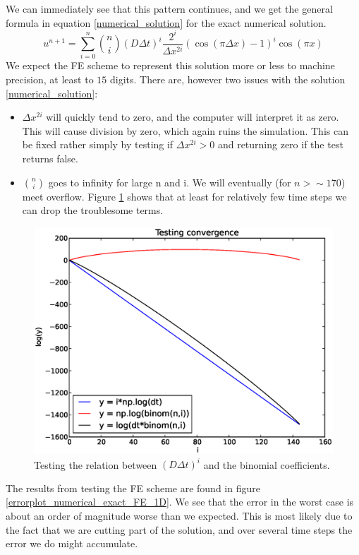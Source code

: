 We can immediately see that this pattern continues, and we get the general formula in equation \ref{numerical_solution} for the exact numerical solution.
\begin{equation}\label{numerical_solution}
  u^{n+1} = \sum\limits_{i=0}^n {n\choose i}\left(D\Delta t\right)^i\frac{2^i}{\Delta x^{2i}}\left(\cos(\pi\Delta x)-1\right)^i\cos(\pi x)
\end{equation}
We expect the FE scheme to represent this solution more or less to machine precision, at least to $15$ digits. 
There are, however two issues with the solution \ref{numerical_solution}:
\begin{itemize}
 \item $\Delta x^{2i}$ will quickly tend to zero, and the computer will interpret it as zero. This will cause division by zero, which again ruins the simulation. This can be fixed rather simply by testing if $\Delta x^{2i}>0$ and returning zero if the test returns false.
 \item ${n\choose i}$ goes to infinity for large n and i. We will eventually (for $n>\sim170$) meet overflow. Figure \ref{convergence_exact_numerical_1d_n145} shows that at least for relatively few time steps  we can drop the troublesome terms.
\end{itemize}

\begin{figure}[H]
 \centering
 \includegraphics[scale=0.7]{Figures/convergence_exact_numerical_1d_n145}
 \caption{Testing the relation between $\left(D\Delta t\right)^i$ and the binomial coefficients.}
 \label{convergence_exact_numerical_1d_n145}
\end{figure}
The results from testing the FE scheme are found in figure \ref{errorplot_numerical_exact_FE_1D}. We see that the error in the worst case is about an order of magnitude worse than we expected. This is most likely due to the fact that we are cutting part of the solution, and over several time steps the error we do might accumulate.


